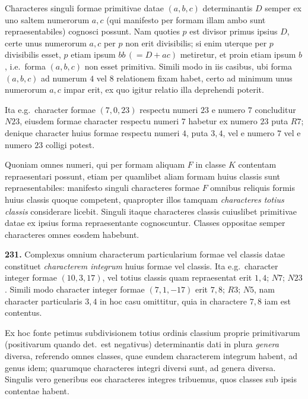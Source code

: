 \documentclass[12pt,a4paper]{article}
\theoremstyle{plain}
\theoremstyle{definition}
\theoremstyle{remark}
\begin{document}
Characteres singuli formae primitivae datae $(a,b,c)$ determinantis $D$ semper ex uno saltem numerorum $a,c$ (qui manifesto per formam illam ambo sunt repraesentabiles) cognosci possunt. Nam quoties $p$ est divisor primus ipsius $D$, certe unus numerorum $a,c$ per $p$ non erit divisibilis; si enim uterque per $p$ divisibilis esset, $p$ etiam ipsum $bb\,(=D+ac)$ metiretur, et proin etiam ipsum $b$, i.e.\ forma $(a,b,c)$ non esset primitiva. Simili modo in iis casibus, ubi forma $(a,b,c)$ ad numerum $4$ vel $8$ relationem fixam habet, certo ad minimum unus numerorum $a,c$ impar erit, ex quo igitur relatio illa deprehendi poterit.

Ita e.g.\ character formae $(7,0,23)$ respectu numeri $23$ e numero $7$ concluditur $N23$, eiusdem formae character respectu numeri $7$ habetur ex numero $23$ puta $R7$; denique character huius formae respectu numeri $4$, puta $3,4$, vel e numero $7$ vel e numero $23$ colligi potest.

Quoniam omnes numeri, qui per formam aliquam $F$ in classe $K$ contentam repraesentari possunt, etiam per quamlibet aliam formam huius classis sunt repraesentabiles: manifesto singuli characteres formae $F$ omnibus reliquis formis huius classis quoque competent, quapropter illos tamquam \emph{characteres totius classis} considerare licebit. Singuli itaque characteres classis cuiuslibet primitivae datae ex ipsius forma repraesentante cognoscuntur. Classes oppositae semper characteres omnes eosdem habebunt.

\textbf{231.}
Complexus omnium characterum particularium formae vel classis datae constituet \emph{characterem integrum} huius formae vel classis. Ita e.g.\ character integer formae $(10,3,17)$, vel totius classis quam repraesentat erit $1,4$; $N7$; $N23$. Simili modo character integer formae $(7,1,-17)$ erit $7,8$; $R3$; $N5$, nam character particularis $3,4$ in hoc casu omittitur, quia in charactere $7,8$ iam est contentus.

Ex hoc fonte petimus subdivisionem totius ordinis classium proprie primitivarum (positivarum quando det.\ est negativus) determinantis dati in plura \emph{genera} diversa, referendo omnes classes, quae eundem characterem integrum habent, ad genus idem; quarumque characteres integri diversi sunt, ad genera diversa. Singulis vero generibus eos characteres integres tribuemus, quos classes sub ipsis contentae habent.
\end{document}
